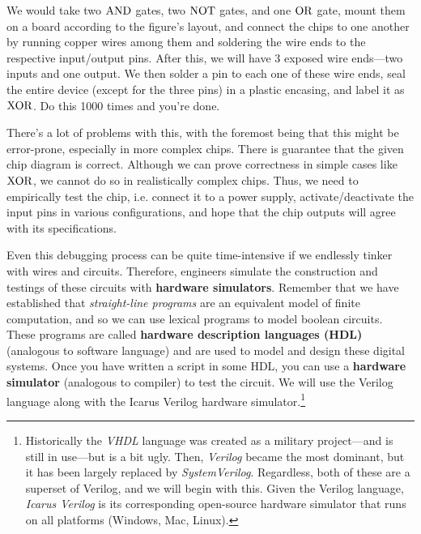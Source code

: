   We would take two $\operatorname{AND}$ gates, two $\operatorname{NOT}$ gates, and one $\operatorname{OR}$ gate, mount them on a board according to the figure's layout, and connect the chips to one another by running copper wires among them and soldering the wire ends to the respective input/output pins. After this, we will have 3 exposed wire ends---two inputs and one output. We then solder a pin to each one of these wire ends, seal the entire device (except for the three pins) in a plastic encasing, and label it as $\operatorname{XOR}$. Do this 1000 times and you're done. 

  There's a lot of problems with this, with the foremost being that this might be error-prone, especially in more complex chips. There is guarantee that the given chip diagram is correct. Although we can prove correctness in simple cases like $\operatorname{XOR}$, we cannot do so in realistically complex chips. Thus, we need to empirically test the chip, i.e. connect it to a power supply, activate/deactivate the input pins in various configurations, and hope that the chip outputs will agree with its specifications. 

  Even this debugging process can be quite time-intensive if we endlessly tinker with wires and circuits. Therefore, engineers simulate the construction and testings of these circuits with \textbf{hardware simulators}. Remember that we have established that \textit{straight-line programs} are an equivalent model of finite computation, and so we can use lexical programs to model boolean circuits. These programs are called \textbf{hardware description languages (HDL)} (analogous to software language) and are used to model and design these digital systems. Once you have written a script in some HDL, you can use a \textbf{hardware simulator} (analogous to compiler) to test the circuit. We will use the Verilog language along with the Icarus Verilog hardware simulator.\footnote{Historically the \textit{VHDL} language was created as a military project---and is still in use---but is a bit ugly.  Then, \textit{Verilog} became the most dominant, but it has been largely replaced by \textit{SystemVerilog}. Regardless, both of these are a superset of Verilog, and we will begin with this. Given the Verilog language, \textit{Icarus Verilog} is its corresponding open-source hardware simulator that runs on all platforms (Windows, Mac, Linux).}

